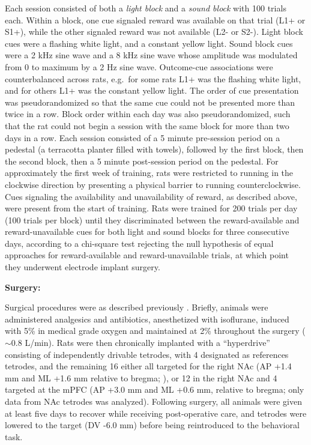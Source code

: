 \documentclass[11pt]{article}
\let\cite=\citep
\let\citeNP=\citealt
\providecommand{\DIFadd}[1]{{\protect\color{red} \sf #1}} %
\providecommand{\DIFdel}[1]{} %
\providecommand{\DIFaddbegin}{} %
\providecommand{\DIFaddend}{} %
\providecommand{\DIFdelbegin}{} %
\providecommand{\DIFdelend}{} %
\newcommand{\DIFscaledelfig}{0.5}
\newlength{\DIFdelgraphicswidth} %
\newlength{\DIFdelgraphicsheight} %
\newcommand{\DIFaddincludegraphics}[2][]{{\color{red}\fbox{\DIFOincludegraphics[#1]{#2}}}} %
\newcommand{\DIFdelincludegraphics}[2][]{%
\sbox{\DIFdelgraphicsbox}{\DIFOincludegraphics[#1]{#2}}%
\settoboxwidth{\DIFdelgraphicswidth}{\DIFdelgraphicsbox} %
\settoboxtotalheight{\DIFdelgraphicsheight}{\DIFdelgraphicsbox} %
\scalebox{\DIFscaledelfig}{%
\parbox[b]{\DIFdelgraphicswidth}{\usebox{\DIFdelgraphicsbox}\\[-\baselineskip] \rule{\DIFdelgraphicswidth}{0em}}\llap{\resizebox{\DIFdelgraphicswidth}{\DIFdelgraphicsheight}{%
\setlength{\unitlength}{\DIFdelgraphicswidth}%
\begin{picture}(1,1)%
\thicklines\linethickness{2pt} %
{\color[rgb]{1,0,0}\put(0,0){\framebox(1,1){}}}%
{\color[rgb]{1,0,0}\put(0,0){\line( 1,1){1}}}%
{\color[rgb]{1,0,0}\put(0,1){\line(1,-1){1}}}%
\end{picture}%
}\hspace*{3pt}}} %
} %
\DeclareRobustCommand{\DIFaddbegin}{\DIFOaddbegin \let\includegraphics\DIFaddincludegraphics} %
\DeclareRobustCommand{\DIFaddend}{\DIFOaddend \let\includegraphics\DIFOincludegraphics} %
\DeclareRobustCommand{\DIFdelbegin}{\DIFOdelbegin \let\includegraphics\DIFdelincludegraphics} %
\DeclareRobustCommand{\DIFdelend}{\DIFOaddend \let\includegraphics\DIFOincludegraphics} %
\begin{document}
Each session consisted of both a {\it light block} and a {\it sound block} with
100 trials each. Within a block, one cue signaled reward was available on that
trial (L1+ or S1+), while the other signaled reward was not available (L2- or
S2-). Light block cues were a flashing white light, and a constant yellow
light. Sound block cues were a 2 kHz sine wave and a 8 kHz sine wave whose
amplitude was modulated from 0 to maximum by a 2 Hz sine wave. Outcome-cue
associations were counterbalanced across rats, e.g.\ for some rats L1+ was the
flashing white light, and for others L1+ was the constant yellow light. The
order of cue presentation was pseudorandomized so that the same cue could not be
presented more than twice in a row. Block order within each day was also
pseudorandomized, such that the rat could not begin a session with the same
block for more than two days in a row. Each session consisted of a 5 minute
pre-session period on a pedestal (a terracotta planter filled with towels),
followed by the first block, then the second block, then a 5 minute post-session
period on the pedestal. For approximately the first week of training, rats were restricted to
running in the clockwise direction by presenting a physical barrier to
running counterclockwise. Cues signaling the availability and
unavailability of reward, as described above, were present from the
start of training. Rats were trained for 200 trials per day (100
trials per block) until they discriminated between the reward-available and reward-unavailable cues for both light and
sound blocks for three consecutive days, according to a chi-square test
rejecting the null hypothesis of equal approaches for reward-available and
reward-unavailable trials, at which point they underwent electrode implant
surgery.

{\bf Surgery:}

Surgical procedures were as described previously
\cite{Malhotra2015}. Briefly, animals were administered analgesics and
antibiotics, anesthetized with isoflurane, induced with 5\% in medical
grade oxygen and maintained at 2\% throughout the surgery (\DIFdelbegin \DIFdel{~}\DIFdelend \DIFaddbegin \DIFadd{$\sim$}\DIFaddend 0.8
L/min). Rats were then chronically implanted with a ``hyperdrive''
consisting of \DIFdelbegin \DIFdel{16 }\DIFdelend \DIFaddbegin \DIFadd{20 }\DIFaddend independently drivable tetrodes, \DIFdelbegin \DIFdel{either all 16
}\DIFdelend \DIFaddbegin \DIFadd{with 4 designated as references tetrodes, and the remaining 16
either all }\DIFaddend targeted for the right NAc (AP +1.4 mm and ML +1.6 mm relative to
bregma; \citeNP{atlas}), or 12 in the right NAc and 4 targeted at the
mPFC (AP +3.0 mm and ML +0.6 mm, relative to bregma; only data from
NAc tetrodes was analyzed). Following surgery, all animals were given
at least five days to recover while receiving post-operative care, and
tetrodes were lowered to the target (DV -6.0 mm) before being
reintroduced to the behavioral task.
\end{document}
